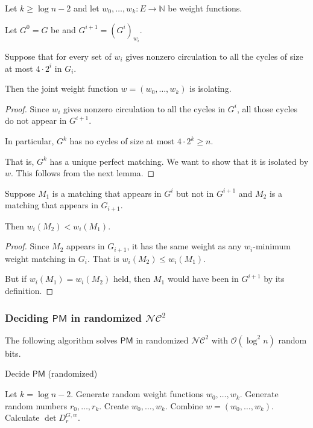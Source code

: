 \documentclass{beamer}
\theoremstyle{remark}
\newcommand{\nn}{\mathbb{N}}
\newcommand{\dpm}{\mathsf{PM}}
\newcommand{\nc}{{\mathcal{NC}}}
\newcommand{\OO}{\mathcal{O}}
\begin{document}
\begin{frame}[allowframebreaks]
  \begin{theorem}
    Let $k \ge \log n - 2$ and let $w_0, \ldots, w_k : E \to \nn$ be weight functions.

    Let $G^0 = G$ be and $G^{i+1} = {\left(G^{i}\right)}_{w_i}$.

    Suppose that for every set of $w_i$ gives nonzero circulation to all the
    cycles of size at most $4 \cdot 2^i$ in $G_{i}$.

    Then the joint weight function $w = (w_0, \ldots, w_k)$ is isolating.
  \end{theorem}

  \begin{proof}
    Since $w_i$ gives nonzero circulation to all the cycles
    in $G^i$, all those cycles do not appear in $G^{i+1}$.

    In particular, $G^k$ has no cycles of size at most $4 \cdot 2^k \ge n$.

    That is, $G^k$ has a unique perfect matching.
    We want to show that it is isolated by $w$.
    This follows from the next lemma.
  \end{proof}

  \begin{lemma}
    Suppose $M_1$ is a matching that appears in $G^i$ but not in $G^{i+1}$ and $M_2$ is a matching
    that appears in $G_{i+1}$.

    Then $w_i(M_2) < w_i(M_1)$.
  \end{lemma}

  \begin{proof}
    Since $M_2$ appears in $G_{i+1}$, it has
    the same weight as any $w_i$-minimum weight matching in $G_i$.
    That is $w_{i}(M_2) \le w_i(M_1)$.

    But if $w_i(M_1) = w_i(M_2)$ held, then $M_1$ would have been in $G^{i+1}$
    by its definition.
  \end{proof}

\end{frame}

\begin{frame}
  \frametitle{Deciding $\dpm$ in randomized $\nc^2$}
  The following algorithm solves $\dpm$ in randomized $\nc^2$
  with $\OO(\log^2 n)$ random bits.

  \begin{algorithm}[H]
    \caption{Decide $\dpm$ (randomized)}
    \begin{algorithmic}
      \STATE Let $k = \log n - 2$.
      \STATE Generate random weight functions $w_0, \ldots, w_k$.
      \STATE Generate random numbers $r_0, \ldots, r_k$.
      \STATE Create $w_0, \ldots, w_k$.
      \STATE Combine $w = (w_0, \ldots, w_k)$.
      \STATE Calculate $\det D_r^{G, w}$.
    \end{algorithmic}
  \end{algorithm}
\end{frame}
\end{document}
